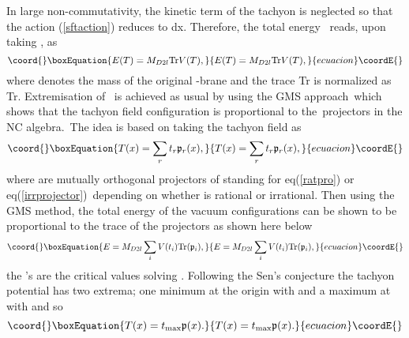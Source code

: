 \documentclass[a4paper,12pt]{article}
\begin{document}
In large non-commutativity, the kinetic term of the tachyon is neglected so
that the action (\ref{sftaction}) reduces to \coordHE{}d\coordHE{}x\coordHE{}. Therefore, the total energy \coordHE{}\ reads, upon
taking \coordHE{}, as
\begin{equation}\coord{}\boxEquation{
E(T)=M_{D2l}\text{Tr}V(T),
}{
E(T)=M_{D2l}\text{Tr}V(T),
}{ecuacion}\coordE{}\end{equation}
where \coordHE{} denotes the mass of the original \coordHE{}-brane and
the trace Tr is normalized as Tr\coordHE{}. Extremisation of
\coordHE{}\ is achieved as usual by using the GMS approach\ which
shows that the tachyon field
configuration is proportional to the\ projectors in the \coordHE{} NC algebra.\ The idea is based on taking the tachyon
field \coordHE{} as
\begin{equation}\coord{}\boxEquation{
T(x)=\sum_{r}t_{r}\frak{p}_{r}(x),
}{
T(x)=\sum_{r}t_{r}\frak{p}_{r}(x),
}{ecuacion}\coordE{}\end{equation}
where \coordHE{}are mutually orthogonal projectors of \coordHE{} standing for \coordHE{} eq(\ref{ratpro}) or \coordHE{} eq(\ref{irrprojector})\ depending on whether
\myHighlight{$\theta $}\coordHE{} is rational or irrational. Then using the GMS method,
the total energy of the vacuum configurations can be shown to be
proportional to the trace of the projectors as shown here below
\begin{equation}\coord{}\boxEquation{
E=M_{D2l}\sum_{i}V(t_{i})\text{Tr}(\frak{p}_{i}),  \label{energy}
}{
E=M_{D2l}\sum_{i}V(t_{i})\text{Tr}(\frak{p}_{i}),  }{ecuacion}\coordE{}\end{equation}
the \coordHE{}'s are the critical values solving \coordHE{}.
Following the Sen's conjecture the tachyon potential \coordHE{} has two extrema;
one minimum at the origin \coordHE{} with \coordHE{} and
a maximum at \coordHE{} with \coordHE{} and so
\begin{equation}\coord{}\boxEquation{\label{tsolution}
T(x)=t_{\text{max}}\frak{p}(x).
}{T(x)=t_{\text{max}}\frak{p}(x).
}{ecuacion}\coordE{}\end{equation}
\end{document}
